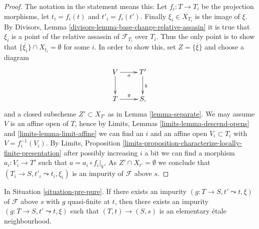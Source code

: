 \begin{proof}
The notation in the statement means this: Let $f_i : T \to T_i$
be the projection morphisms, let $t_i = f_i(t)$ and $t'_i = f_i(t')$.
Finally $\xi_i \in X_{T_i}$ is the image of $\xi$. By
Divisors, Lemma \ref{divisors-lemma-base-change-relative-assasin}
it is true that $\xi_i$ is a point of the relative
assassin of $\mathcal{F}_{T_i}$ over $T_i$. Thus the only point is to
show that $\overline{\{\xi_i\}} \cap X_{t_i} = \emptyset$ for some
$i$. In order to show this, set $Z = \overline{\{\xi\}}$ and
choose a diagram
$$
\xymatrix{
V \ar[d] \ar[r]_a & T' \ar[d]^b \\
T \ar[r]^g & S,
}
$$
and a closed subscheme $Z' \subset X_{T'}$ as in
Lemma \ref{lemma-separate}.
We may assume $V$ is an affine open of $T$, hence by
Limits, Lemmas \ref{limits-lemma-descend-opens} and
\ref{limits-lemma-limit-affine}
we can find an $i$ and an affine open $V_i \subset T_i$ with
$V = f_i^{-1}(V_i)$. By
Limits,
Proposition \ref{limits-proposition-characterize-locally-finite-presentation}
after possibly increasing $i$ a bit we can find a morphism
$a_i : V_i \to T'$ such that $a = a_i \circ f_i|_V$.
As $Z' \cap X_{t'} = \emptyset$ we conclude that
$(T_i \to S, t'_i \leadsto t_i, \xi_i)$ is an impurity of
$\mathcal{F}$ above $s$.
\end{proof}

\begin{lemma}
\label{lemma-quasi-finite-impurity-elementary}
In Situation \ref{situation-pre-pure}.
If there exists an impurity $(g : T \to S, t' \leadsto t, \xi)$
of $\mathcal{F}$ above $s$ with $g$ quasi-finite at $t$, then there
exists an impurity $(g : T \to S, t' \leadsto t, \xi)$ such that
$(T, t) \to (S, s)$ is an elementary \'etale neighbourhood.
\end{lemma}

